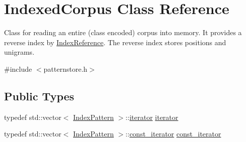 \hypertarget{classIndexedCorpus}{}\section{Indexed\+Corpus Class Reference}
\label{classIndexedCorpus}


Class for reading an entire (class encoded) corpus into memory. It provides a reverse index by \hyperlink{classIndexReference}{Index\+Reference}. The reverse index stores positions and unigrams.  




{\ttfamily \#include $<$patternstore.\+h$>$}

\subsection*{Public Types}
\begin{DoxyCompactItemize}
\item 
typedef std\+::vector$<$ \hyperlink{classIndexPattern}{Index\+Pattern} $>$\+::\hyperlink{classIndexedCorpus_a08602ec2763d0bd068d2c3213edb8256}{iterator} \hyperlink{classIndexedCorpus_a08602ec2763d0bd068d2c3213edb8256}{iterator}
\item 
typedef std\+::vector$<$ \hyperlink{classIndexPattern}{Index\+Pattern} $>$\+::\hyperlink{classIndexedCorpus_a0bb2b3e49bd81618fc39fd6d9d505531}{const\+\_\+iterator} \hyperlink{classIndexedCorpus_a0bb2b3e49bd81618fc39fd6d9d505531}{const\+\_\+iterator}
\end{DoxyCompactItemize}
